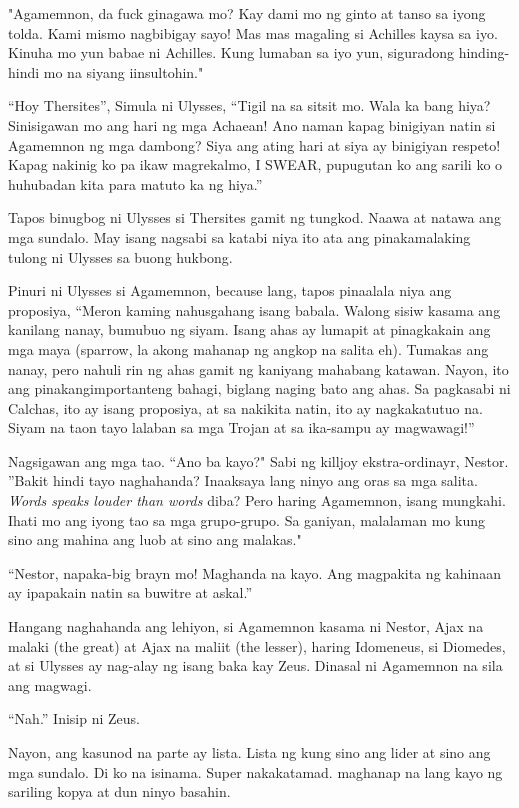 \documentclass[12pt,letterpaper]{report}
\begin{document}
"Agamemnon, da fuck ginagawa mo? Kay dami mo ng ginto at tanso sa iyong tolda. Kami mismo nagbibigay sayo!
Mas mas magaling si Achilles kaysa sa iyo. Kinuha mo yun babae ni Achilles. Kung lumaban sa iyo yun, siguradong hinding-hindi mo na siyang iinsultohin."

``Hoy Thersites'', Simula ni Ulysses, ``Tigil na sa sitsit mo. Wala ka bang hiya? Sinisigawan mo ang hari ng mga Achaean! Ano naman kapag binigiyan natin si Agamemnon ng mga dambong? Siya ang ating hari at siya ay binigiyan respeto! Kapag nakinig ko pa ikaw magrekalmo, I SWEAR, pupugutan ko ang sarili ko o huhubadan kita para matuto ka ng hiya.''

Tapos binugbog ni Ulysses si Thersites gamit ng tungkod. Naawa at natawa ang mga sundalo. May isang nagsabi sa katabi niya ito ata ang pinakamalaking tulong ni Ulysses sa buong hukbong.

Pinuri ni Ulysses si Agamemnon, because lang, tapos pinaalala niya ang proposiya, ``Meron kaming nahusgahang isang babala. Walong sisiw kasama ang kanilang nanay, bumubuo ng siyam. Isang ahas ay lumapit at pinagkakain ang mga maya (sparrow, la akong mahanap ng angkop na salita eh). Tumakas ang nanay, pero nahuli rin ng ahas gamit ng kaniyang mahabang katawan. Nayon, ito ang pinakangimportanteng bahagi, biglang naging bato ang ahas. Sa pagkasabi ni Calchas, ito ay isang proposiya, at sa nakikita natin, ito ay nagkakatutuo na. Siyam na taon tayo lalaban sa mga Trojan at sa ika-sampu ay magwawagi!''

Nagsigawan ang mga tao. ``Ano ba kayo?" Sabi ng killjoy ekstra-ordinayr, Nestor. ''Bakit hindi tayo naghahanda?
Inaaksaya lang ninyo ang oras sa mga salita. \textit{Words speaks louder than words} diba? Pero haring Agamemnon, isang mungkahi. Ihati mo ang iyong tao sa mga grupo-grupo. Sa ganiyan, malalaman mo kung sino ang mahina ang luob at sino ang malakas."

``Nestor, napaka-big brayn mo! Maghanda na kayo. Ang magpakita ng kahinaan ay ipapakain natin sa buwitre at askal.''

Hangang naghahanda ang lehiyon, si Agamemnon kasama ni Nestor, Ajax na malaki (the great) at Ajax na maliit (the lesser), haring Idomeneus, si Diomedes, at si Ulysses ay nag-alay ng isang baka kay Zeus. Dinasal ni Agamemnon na sila ang magwagi.

``Nah.'' Inisip ni Zeus.

Nayon, ang kasunod na parte ay lista. Lista ng kung sino ang lider at sino ang mga sundalo. Di ko na isinama. Super nakakatamad. maghanap na lang kayo ng sariling kopya at dun ninyo basahin.
\end{document}

